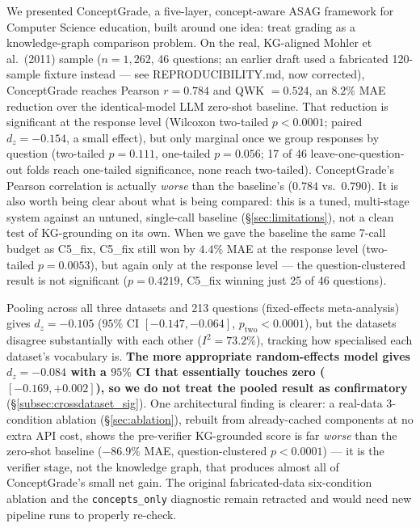 \documentclass[conference]{IEEEtran}
\begin{document}
We presented ConceptGrade, a five-layer, concept-aware ASAG framework
for Computer Science education, built around one idea: treat grading as
a knowledge-graph comparison problem. On the real, KG-aligned Mohler et
al.\ (2011) sample ($n = 1{,}262$, 46 questions; an earlier draft used a
fabricated 120-sample fixture instead --- see REPRODUCIBILITY.md, now
corrected), ConceptGrade reaches Pearson $r = 0.784$ and QWK $= 0.524$,
an $8.2\%$ MAE reduction over the identical-model LLM zero-shot
baseline. That reduction is significant at the response level (Wilcoxon
two-tailed $p<0.0001$; paired $d_z=-0.154$, a small effect), but only
marginal once we group responses by question (two-tailed $p=0.111$,
one-tailed $p=0.056$; 17 of 46 leave-one-question-out folds reach
one-tailed significance, none reach two-tailed). ConceptGrade's Pearson
correlation is actually \emph{worse} than the baseline's ($0.784$ vs.\
$0.790$). It is also worth being clear about what is being compared:
this is a tuned, multi-stage system against an untuned, single-call
baseline (\S\ref{sec:limitations}), not a clean test of KG-grounding on
its own. When we gave the baseline the same 7-call budget as C5\_fix,
C5\_fix still won by $4.4\%$ MAE at the response level (two-tailed
$p=0.0053$), but again only at the response level --- the
question-clustered result is not significant ($p=0.4219$, C5\_fix
winning just 25 of 46 questions).

Pooling across all three datasets and 213 questions (fixed-effects
meta-analysis) gives $d_z = -0.105$ ($95\%$ CI $[-0.147, -0.064]$,
$p_{\text{two}} < 0.0001$), but the datasets disagree substantially with
each other ($I^2 = 73.2\%$), tracking how specialised each dataset's
vocabulary is. \textbf{The more appropriate random-effects model gives
$d_z=-0.084$ with a $95\%$ CI that essentially touches zero
($[-0.169, +0.002]$), so we do not treat the pooled result as
confirmatory} (\S\ref{subsec:crossdataset_sig}). One architectural
finding is clearer: a real-data 3-condition ablation
(\S\ref{sec:ablation}), rebuilt from already-cached components at no
extra API cost, shows the pre-verifier KG-grounded score is far
\emph{worse} than the zero-shot baseline ($-86.9\%$ MAE,
question-clustered $p<0.0001$) --- it is the verifier stage, not the
knowledge graph, that produces almost all of ConceptGrade's small net
gain. The original fabricated-data six-condition ablation and the
\texttt{concepts\_only} diagnostic remain retracted and would need new
pipeline runs to properly re-check.
\end{document}
